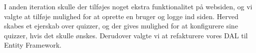 
I anden iteration skulle der tilføjes noget ekstra funktionalitet på websiden, og vi valgte at tilføje mulighed for at oprette en bruger og logge ind siden. Herved skabes et ejerskab over quizzer, og der gives mulighed for at konfigurere sine quizzer, hvis det skulle ønskes. Derudover valgte vi at refakturere vores DAL til Entity Framework. 
















